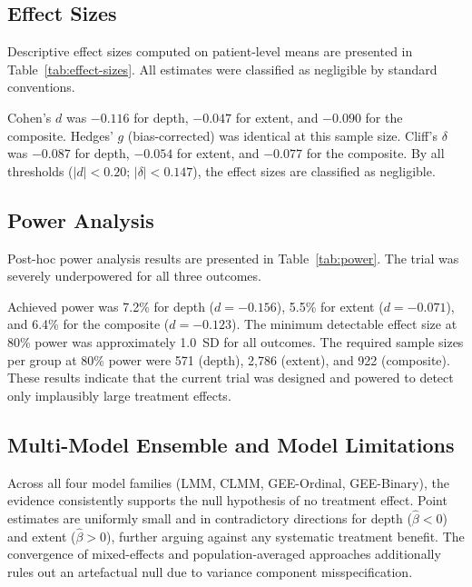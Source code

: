 

\subsection{Effect Sizes}

Descriptive effect sizes computed on patient-level means are presented in Table~\ref{tab:effect-sizes}. All estimates were classified as negligible by standard conventions.



Cohen's $d$ was $-0.116$ for depth, $-0.047$ for extent, and $-0.090$ for the composite. Hedges' $g$ (bias-corrected) was identical at this sample size. Cliff's $\delta$ was $-0.087$ for depth, $-0.054$ for extent, and $-0.077$ for the composite. By all thresholds ($|d| < 0.20$; $|\delta| < 0.147$), the effect sizes are classified as negligible.

\subsection{Power Analysis}

Post-hoc power analysis results are presented in Table~\ref{tab:power}. The trial was severely underpowered for all three outcomes.



Achieved power was 7.2\% for depth ($d = -0.156$), 5.5\% for extent ($d = -0.071$), and 6.4\% for the composite ($d = -0.123$). The minimum detectable effect size at 80\% power was approximately 1.0~SD for all outcomes. The required sample sizes per group at 80\% power were 571 (depth), 2{,}786 (extent), and 922 (composite). These results indicate that the current trial was designed and powered to detect only implausibly large treatment effects.

\subsection{Multi-Model Ensemble and Model Limitations}

Across all four model families (LMM, CLMM, GEE-Ordinal, GEE-Binary), the evidence consistently supports the null hypothesis of no treatment effect. Point estimates are uniformly small and in contradictory directions for depth ($\hat{\beta} < 0$) and extent ($\hat{\beta} > 0$), further arguing against any systematic treatment benefit. The convergence of mixed-effects and population-averaged approaches additionally rules out an artefactual null due to variance component misspecification.

